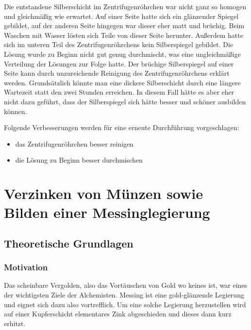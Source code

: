 \documentclass{article}
\begin{document}
      Die entstandene Silberschicht im Zentrifugenröhrchen war nicht ganz so homogen und gleichmäßig wie erwartet. Auf einer Seite hatte sich ein glänzender Spiegel gebildet, auf der anderen Seite hingegen war dieser eher matt und brüchig. Beim Waschen mit Wasser lösten sich Teile von dieser Seite herunter. Außerdem hatte sich im unteren Teil des Zentrifugenröhrchens kein Silberspiegel gebildet. Die Lösung wurde zu Beginn nicht gut genug durchmischt, was eine ungleichmäßige Verteilung der Lösungen zur Folge hatte. Der brüchige Silberspiegel auf einer Seite kann durch unzureichende Reinigung des Zentrifugenröhrchens erklärt werden. Grundsätzlich könnte man eine dickere Silberschicht durch eine längere Wartezeit statt den zwei Stunden erreichen. In diesem Fall hätte es aber eher nicht dazu geführt, dass der Silberspiegel sich hätte besser und schöner ausbilden können. 
      
      Folgende Verbesserungen werden für eine erneute Durchführung vorgeschlagen:
      
      \begin{itemize}
        \item das Zentrifugenröhrchen besser reinigen
        \item die Lösung zu Beginn besser durchmischen
      \end{itemize}
  
  \pagebreak
  
  \section{Verzinken von Münzen sowie Bilden einer Messinglegierung}
  
    \subsection{Theoretische Grundlagen}
      
      \subsubsection{Motivation}
        
        Das scheinbare Vergolden, also das Vortäuschen von Gold wo keines ist, war eines der wichtigsten Ziele der Alchemisten. Messing ist eine gold-glänzende Legierung und eignet sich dazu also vortrefflich. Um eine solche Legierung herzustellen wird auf einer Kupferschicht elementares Zink abgeschieden und dieses dann kurz erhitzt. 
        
\end{document}
